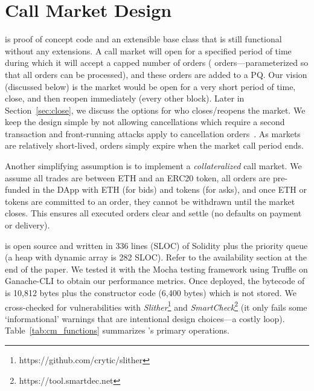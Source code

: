 
\section{Call Market Design}



\cm is proof of concept code and an extensible base class that is still functional without any extensions. A call market will open for a specified period of time during which it will accept a capped number of orders ( orders---parameterized so that all orders can be processed), and these orders are added to a PQ. Our vision (discussed below) is the market would be open for a very short period of time, close, and then reopen immediately (\eg every other block). Later in Section~\ref{sec:close}, we discuss the options for who closes/reopens the market. We keep the design simple by not allowing cancellations which require a second transaction and front-running attacks apply to cancellation orders~\cite{eskandari2019sok}. As markets are relatively short-lived, orders simply expire when the market call period ends.

Another simplifying assumption is to implement a \textit{collateralized} call market. We assume all trades are between ETH and an ERC20 token, all orders are pre-funded in the DApp with ETH (for bids) and tokens (for asks), and once ETH or tokens are committed to an order, they cannot be withdrawn until the market closes. This ensures all executed orders clear and settle (\ie no defaults on payment or delivery).


\cm is open source and written in 336 lines (SLOC) of Solidity plus the priority queue (\eg a heap with dynamic array is 282 SLOC). Refer to the availability section at the end of the paper. We tested it with the Mocha testing framework using Truffle on Ganache-CLI to obtain our performance metrics. Once deployed, the bytecode of \cm is 10,812 bytes plus the constructor code (6,400 bytes) which is not stored. We cross-checked for vulnerabilities with \textit{Slither}\footnote{https://github.com/crytic/slither} and \textit{SmartCheck}\footnote{https://tool.smartdec.net} (it only fails some `informational' warnings that are intentional design choices---\eg a costly loop). Table~\ref{tab:cm_functions} summarizes \cm's primary operations.


